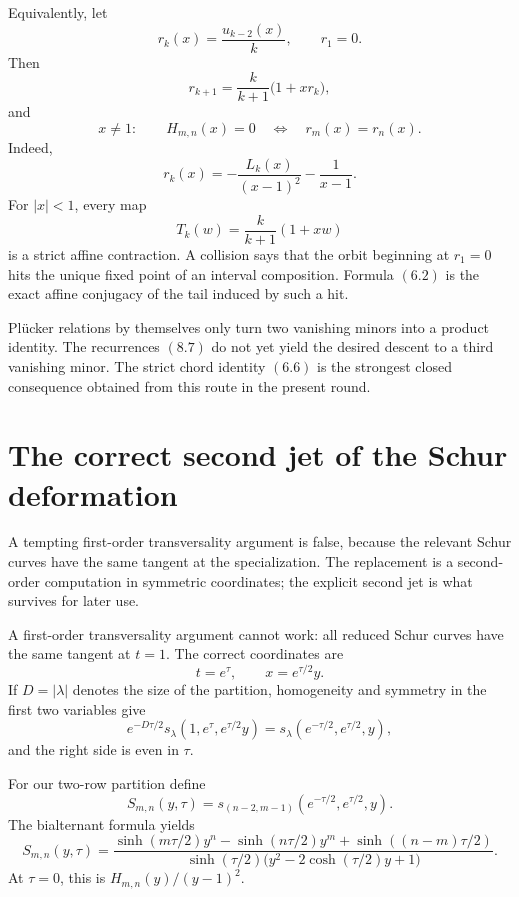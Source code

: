 \documentclass[11pt]{article}
\theoremstyle{definition}
\begin{document}
Equivalently, let
\[
 r_k(x)=\frac{u_{k-2}(x)}k,
 \qquad r_1=0.
\]
Then
\begin{equation}
 r_{k+1}=\frac{k}{k+1}\bigl(1+xr_k\bigr),
 \tag{8.9}
\end{equation}
and
\begin{equation}
 x\neq1:\qquad
 H_{m,n}(x)=0
 \quad\Longleftrightarrow\quad
 r_m(x)=r_n(x).
 \tag{8.10}
\end{equation}
Indeed,
\begin{equation}
 r_k(x)=-\frac{L_k(x)}{(x-1)^2}-\frac1{x-1}.
 \tag{8.11}
\end{equation}
For \(|x|<1\), every map
\[
 T_k(w)=\frac{k}{k+1}(1+xw)
\]
is a strict affine contraction.  A collision says that the orbit beginning at
\(r_1=0\) hits the unique fixed point of an interval composition.  Formula
\((6.2)\) is the exact affine conjugacy of the tail induced by such a hit.

Pl\"ucker relations by themselves only turn two vanishing minors into a product
identity.  The recurrences \((8.7)\) do not yet yield the desired descent to a
third vanishing minor.  The strict chord identity \((6.6)\) is the strongest
closed consequence obtained from this route in the present round.

\section{The correct second jet of the Schur deformation}
\label{sec:secondjet}

A tempting first-order transversality argument is false, because the relevant Schur curves have the same tangent at the specialization.  The replacement is a second-order computation in symmetric coordinates; the explicit second jet is what survives for later use.

A first-order transversality argument cannot work: all reduced Schur curves
have the same tangent at \(t=1\).  The correct coordinates are
\[
 t=e^\tau,
 \qquad
 x=e^{\tau/2}y.
\]
If $D=|\lambda|$ denotes the size of the partition, homogeneity and symmetry
in the first two variables give
\[
 e^{-D\tau/2}s_\lambda(1,e^\tau,e^{\tau/2}y)
 =s_\lambda(e^{-\tau/2},e^{\tau/2},y),
\]
and the right side is even in \(\tau\).

For our two-row partition define
\[
 S_{m,n}(y,\tau)
 =s_{(n-2,m-1)}(e^{-\tau/2},e^{\tau/2},y).
\]
The bialternant formula yields
\begin{equation}
 S_{m,n}(y,\tau)=
 \frac{
 \sinh(m\tau/2)y^n-
 \sinh(n\tau/2)y^m+
 \sinh((n-m)\tau/2)
 }{
 \sinh(\tau/2)
 \bigl(y^2-2\cosh(\tau/2)y+1\bigr)
 }.
 \tag{9.1}
\end{equation}
At \(\tau=0\), this is \(H_{m,n}(y)/(y-1)^2\).
\end{document}
